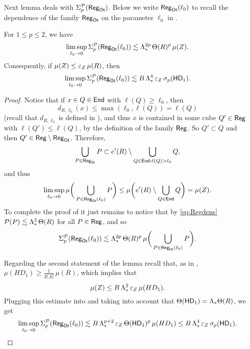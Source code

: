 Next lemma deals with $\Sigma_p^{\mathcal P}({\mathsf{Reg}}_{\mathsf{Ot}})$. Below we write ${\mathsf{Reg}}_{\mathsf{Ot}}(\ell_0)$ to recall the dependence of the family ${\mathsf{Reg}}_{\mathsf{Ot}}$ on the parameter
$\ell_0$ in .

\begin{lemma}\label{lemregot}
For $1\leq p\leq2$, we have
\begin{equation}\label{eqgaga34}
\limsup_{\ell_0\to0} \Sigma_p^{\mathcal P}({\mathsf{Reg}}_{\mathsf{Ot}}(\ell_0)) \lesssim \Lambda_*^{2p}\,\Theta(R)^p\,\mu(Z).
\end{equation}
Consequently, if $\mu(Z)\leq {\varepsilon}_Z\,\mu(R)$, then
\begin{equation}\label{eqgaga35}
\limsup_{\ell_0\to0} \Sigma_p^{\mathcal P}({\mathsf{Reg}}_{\mathsf{Ot}}(\ell_0)) \lesssim B\,\Lambda_*^4\,{\varepsilon}_Z\,\sigma_p({\mathsf{HD}}_1).
\end{equation}
\end{lemma}
\begin{proof}
Notice that if $x\in Q\in{\mathsf{End}}$ with $\ell(Q)\geq \ell_0$, then 
$$d_{R,\ell_0}(x)\leq \max(\ell_0,\ell(Q)) = \ell(Q)$$
(recall that $d_{R,\ell_0}$ is defined in ), and thus $x$ is contained in some cube $Q'\in{\mathsf{Reg}}$ with $\ell(Q')\leq \ell(Q)$, by the definition of the family ${\mathsf{Reg}}$. So $Q'\subset Q$ and then $Q'\in{\mathsf{Reg}}\setminus {\mathsf{Reg}}_{\mathsf{Ot}}$. Therefore,
\begin{equation}\label{eqregotin}
\bigcup_{P\in{\mathsf{Reg}}_{\mathsf{Ot}}} P \subset e'(R) \setminus \bigcup_{Q\in{\mathsf{End}}:\ell(Q)>\ell_0} Q,
\end{equation}
and thus
\begin{equation}\label{eqlimot62}
\limsup_{\ell_0\to0} \mu\bigg(\bigcup_{P\in{\mathsf{Reg}}_{\mathsf{Ot}}(\ell_0)} P\bigg) \leq \mu\bigg(e'(R) \setminus \bigcup_{Q\in{\mathsf{End}}} Q\bigg) = \mu(Z).
\end{equation}
To complete the proof of  it just remains to notice that by \eqref{eq:Regdens} ${\mathcal P}(P)\lesssim \Lambda_*^2\,\Theta(R)$ for all $P\in{\mathsf{Reg}}$, and so
$$\Sigma_p^{\mathcal P}({\mathsf{Reg}}_{\mathsf{Ot}}(\ell_0)) \lesssim \Lambda_*^{2p}\,\Theta(R)^p \,\mu\bigg(\bigcup_{P\in{\mathsf{Reg}}_{\mathsf{Ot}}(\ell_0)} P\bigg).$$

Regarding the second statement of the lemma recall that, as in ,
$\mu(HD_1) \geq  \frac1{B\,\Lambda_*^2}\,\mu(R)$, which implies that
$$\mu(Z) \leq B\,\Lambda_*^2\,{\varepsilon}_Z\,\mu(HD_1).$$
Plugging this estimate into  and taking into account that $\Theta({\mathsf{HD}}_1)=\Lambda_*\Theta(R)$, we get 
$$\limsup_{\ell_0\to0} \Sigma_p^{\mathcal P}({\mathsf{Reg}}_{\mathsf{Ot}}(\ell_0)) \lesssim B\,\Lambda_*^{p+2}\,{\varepsilon}_Z\,\Theta({\mathsf{HD}}_1)^p\,\mu(HD_1) \leq B\,\Lambda_*^4\,{\varepsilon}_Z\,\sigma_p({\mathsf{HD}}_1).$$
\end{proof}

